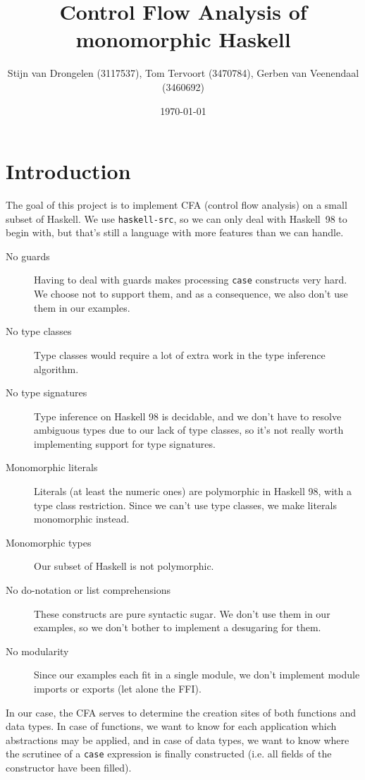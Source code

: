 \documentclass[a4paper]{scrartcl}
\title{Control Flow Analysis of monomorphic Haskell}
\author{Stijn van Drongelen {\tiny(3117537)},
        Tom Tervoort {\tiny(3470784)},
        Gerben van Veenendaal {\tiny(3460692)}}
\date{\today}
\begin{document}
\maketitle

\section{Introduction}
The goal of this project is to implement CFA (control flow analysis) on a small
subset of Haskell. We use \texttt{haskell-src}, so we can only deal with
Haskell~98 to begin with, but that's still a language with more features than
we can handle.

\begin{description}
\item[No guards]
    Having to deal with guards makes processing \texttt{case} constructs very
    hard. We choose not to support them, and as a consequence, we also don't
    use them in our examples.
\item[No type classes]
    Type classes would require a lot of extra work in the type inference
    algorithm.
\item[No type signatures]
    Type inference on Haskell 98 is decidable, and we don't have to resolve
    ambiguous types due to our lack of type classes, so it's not really worth
    implementing support for type signatures.
\item[Monomorphic literals]
    Literals (at least the numeric ones) are polymorphic in Haskell 98, with
    a type class restriction. Since we can't use type classes, we make literals
    monomorphic instead.
\item[Monomorphic types]
    Our subset of Haskell is not polymorphic.
\item[No do-notation or list comprehensions]
    These constructs are pure syntactic sugar. We don't use them in our examples,
    so we don't bother to implement a desugaring for them.
\item[No modularity]
    Since our examples each fit in a single module, we don't implement module
    imports or exports (let alone the FFI).
\end{description}

In our case, the CFA serves to determine the creation sites of both functions
and data types. In case of functions, we want to know for each application
which abstractions may be applied, and in case of data types, we want to know
where the scrutinee of a \texttt{case} expression is finally constructed
(i.e. all fields of the constructor have been filled).
\end{document}
